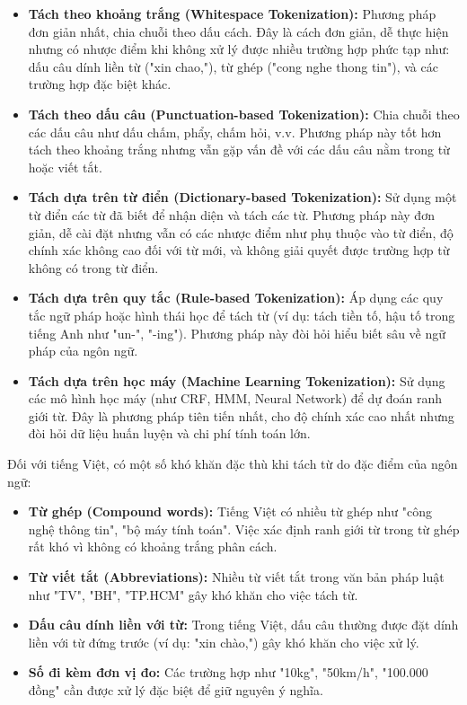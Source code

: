 \documentclass[../BTL.tex]{subfiles}
\begin{document}
\begin{itemize}
    \item \textbf{Tách theo khoảng trắng (Whitespace Tokenization):} Phương pháp đơn giản nhất, chia chuỗi theo dấu cách. Đây là cách đơn giản, dễ thực hiện nhưng có nhược điểm khi không xử lý được nhiều trường hợp phức tạp như: dấu câu dính liền từ ("xin chao,"), từ ghép ("cong nghe thong tin"), và các trường hợp đặc biệt khác.
    
    \item \textbf{Tách theo dấu câu (Punctuation-based Tokenization):} Chia chuỗi theo các dấu câu như dấu chấm, phẩy, chấm hỏi, v.v. Phương pháp này tốt hơn tách theo khoảng trắng nhưng vẫn gặp vấn đề với các dấu câu nằm trong từ hoặc viết tắt.
    
    \item \textbf{Tách dựa trên từ điển (Dictionary-based Tokenization):} Sử dụng một từ điển các từ đã biết để nhận diện và tách các từ. Phương pháp này đơn giản, dễ cài đặt nhưng vẫn có các nhược điểm như phụ thuộc vào từ điển, độ chính xác không cao đối với từ mới, và không giải quyết được trường hợp từ không có trong từ điển.
    
    \item \textbf{Tách dựa trên quy tắc (Rule-based Tokenization):} Áp dụng các quy tắc ngữ pháp hoặc hình thái học để tách từ (ví dụ: tách tiền tố, hậu tố trong tiếng Anh như "un-", "-ing"). Phương pháp này đòi hỏi hiểu biết sâu về ngữ pháp của ngôn ngữ.
    
    \item \textbf{Tách dựa trên học máy (Machine Learning Tokenization):} Sử dụng các mô hình học máy (như CRF, HMM, Neural Network) để dự đoán ranh giới từ. Đây là phương pháp tiên tiến nhất, cho độ chính xác cao nhất nhưng đòi hỏi dữ liệu huấn luyện và chi phí tính toán lớn.
\end{itemize}

Đối với tiếng Việt, có một số khó khăn đặc thù khi tách từ do đặc điểm của ngôn ngữ:

\begin{itemize}
    \item \textbf{Từ ghép (Compound words):} Tiếng Việt có nhiều từ ghép như "công nghệ thông tin", "bộ máy tính toán". Việc xác định ranh giới từ trong từ ghép rất khó vì không có khoảng trắng phân cách.
    
    \item \textbf{Từ viết tắt (Abbreviations):} Nhiều từ viết tắt trong văn bản pháp luật như "TV", "BH", "TP.HCM" gây khó khăn cho việc tách từ.
    
    \item \textbf{Dấu câu dính liền với từ:} Trong tiếng Việt, dấu câu thường được đặt dính liền với từ đứng trước (ví dụ: "xin chào,") gây khó khăn cho việc xử lý.
    
    \item \textbf{Số đi kèm đơn vị đo:} Các trường hợp như "10kg", "50km/h", "100.000 đồng" cần được xử lý đặc biệt để giữ nguyên ý nghĩa.
\end{itemize}
\end{document}
